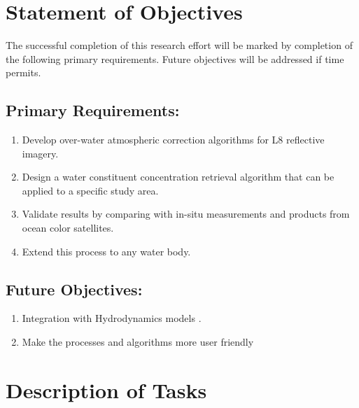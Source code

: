 \section{Statement of Objectives}
\label{sec:objectives}
The successful completion of this research effort will be marked by completion of the following primary requirements. Future objectives will be addressed if time permits.

\subsection{Primary Requirements:}
\begin{enumerate}
	\item Develop over-water atmospheric correction algorithms for L8 reflective imagery.
	\item Design a water constituent concentration retrieval algorithm that can be applied to a specific study area.
	\item Validate results by comparing with in-situ measurements and products from ocean color satellites.
	\item Extend this process to any water body.
\end{enumerate}

\subsection{Future Objectives:}
\begin{enumerate}
	\item Integration with Hydrodynamics models  .
	\item Make the processes and algorithms more user friendly 
\end{enumerate}
\section{Description of Tasks}
\label{sec:tasks}

